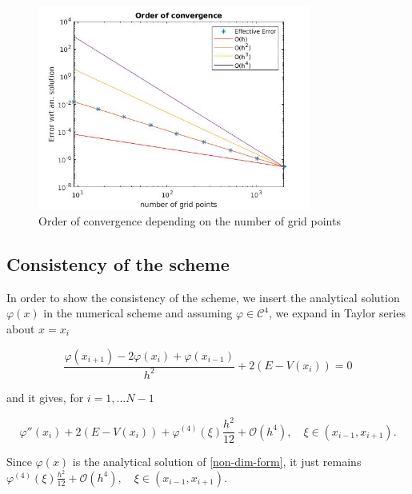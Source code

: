 \documentclass[12pt,a4paper,onecolumn]{article}
\theoremstyle{definition}
\theoremstyle{plain}
\newcommand{\var}{\varphi}
\begin{document}
\begin{figure}[h]

	 \centering
	  \includegraphics[width=0.8\textwidth]{OrderConst.jpg}
	  \caption{Order of convergence depending on the number of grid points}
	  \label{fig:OrderConst}
\end{figure}







\subsection{Consistency of the scheme}

In order to show the consistency of the scheme, we insert the analytical solution $\var(x)$ in the numerical scheme and assuming $\var \in \mathcal{C}^{4}$, we expand in Taylor series about $x=x_i$

 \[ \frac{\var(x_{i+1})-2\var(x_i)+\var(x_{i-1})}{h^2}+2(E-V(x_i))=0  \]

and it gives, for $i=1, \ldots N-1$

\[ \var ''(x_i)+2(E-V(x_i))+ \var^{(4)}(\xi) \frac{h^2}{12}+\mathcal{O}(h^4), \quad \xi \in (x_{i-1},x_{i+1}).\]

Since $\var(x)$ is the analytical solution of \eqref{non-dim-form}, it just remains $ \var^{(4)}(\xi) \frac{h^2}{12}+\mathcal{O}(h^4), \quad \xi \in (x_{i-1},x_{i+1})$.


\end{document}
